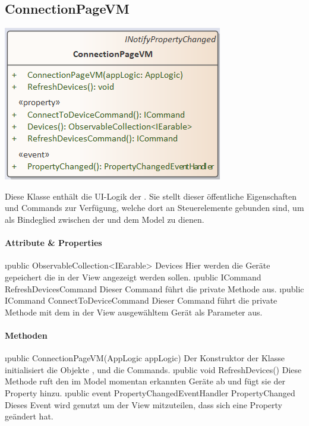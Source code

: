 \documentclass[../entwurf.tex]{subfiles}
\begin{document}
\subsection{ConnectionPageVM}
\begin{minipage}{0.55\textwidth}
\includegraphics[scale=0.75]{../graphics/vm_klassen/ConnectionPageVM.png}
\end{minipage}
\begin{minipage}{0.45\textwidth}
Diese Klasse enthält die UI-Logik der . Sie stellt dieser öffentliche Eigenschaften und Commands zur Verfügung, welche dort an Steuerelemente gebunden sind, um als Bindeglied zwischen der  und dem Model zu dienen.
\end{minipage}
\paragraph{Attribute \& Properties}
\begin{itemize}
	\i{public ObservableCollection<IEarable> Devices} Hier werden die Geräte gepeichert die in der View angezeigt werden sollen.
	\i{public ICommand RefreshDevicesCommand} Dieser Command führt die private Methode  aus. 
	\i{public ICommand ConnectToDeviceCommand} Dieser Command führt die private Methode  mit dem in der View ausgewähltem Gerät als Parameter aus. 
\end{itemize}
\paragraph{Methoden}
\begin{itemize}
	\i{public ConnectionPageVM(AppLogic appLogic)} Der Konstruktor der Klasse initialisiert die Objekte ,  und die Commands.
	\i{public void RefreshDevices()} Diese Methode ruft den im Model momentan erkannten Geräte ab und fügt sie der Property  hinzu.
	\i{public event PropertyChangedEventHandler PropertyChanged} Dieses Event wird genutzt um der View mitzuteilen, dass sich eine Property geändert hat.
\end{itemize}
\end{document}
